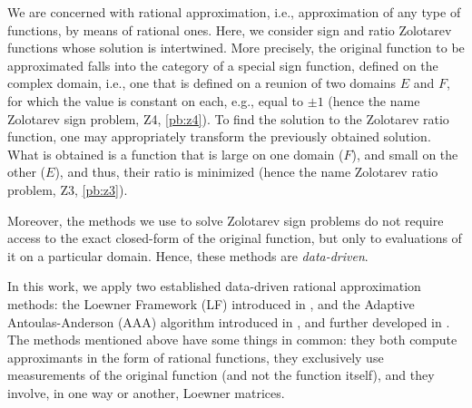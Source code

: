 We are concerned with rational approximation, i.e.,  approximation of any type of functions, by means of rational ones. Here, we consider sign and ratio Zolotarev functions whose solution is intertwined. More precisely, the original function to be approximated falls into the category of a special sign function, defined on the complex domain, i.e., one that is defined on a reunion of two domains $E$ and $F$, for which the value is constant on each, e.g., equal to $\pm 1$ (hence the name Zolotarev sign problem, Z4, \cref{pb:z4}). To find the solution to the Zolotarev ratio function, one may appropriately transform the previously obtained solution. What is obtained is a function that is large on one domain ($F$), and small on the other ($E$), and thus, their ratio is minimized (hence the name Zolotarev ratio problem, Z3, \cref{pb:z3}). 

Moreover, the methods we use to solve Zolotarev sign problems do not require access to the exact closed-form of the original function, but only to evaluations of it on a particular domain. Hence, these methods are \emph{data-driven}.

In this work, we apply two established data-driven rational approximation methods: the Loewner Framework (LF) introduced in \cite{ajm07}, and the Adaptive Antoulas-Anderson (AAA) algorithm introduced in \cite{nst18}, and further developed in \cite{nakatsukasa2020algorithm,trefethen2024computation}. 
The methods mentioned above have some things in common: they both compute approximants in the form of rational functions, they exclusively use measurements of the original function (and not the function itself), and they involve, in one way or another, Loewner matrices.

